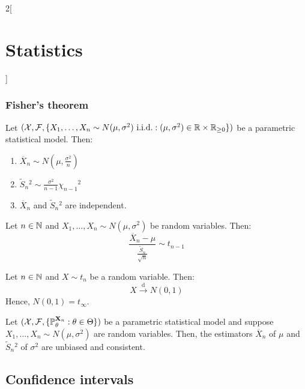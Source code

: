 \documentclass[../../../main_math.tex]{subfiles}
\begin{document}
\begin{multicols}{2}[\section{Statistics}]
  \subsubsection{Fisher's theorem}
  \begin{theorem}
    Let $(\mathcal{X},\mathcal{F},\{X_1,\ldots, \\X_n\sim N(\mu,\sigma^2)\text{ i.i.d.}:(\mu,\sigma^2)\in\mathbb{R}\times\mathbb{R}_{\geq 0}\})$ be a parametric statistical model. Then:
    \begin{enumerate}
      \item $\overline{X}_n\sim N\left(\mu,\frac{\sigma^2}{n}\right)$
      \item $\tilde{S}_n{}^2\sim\frac{\sigma^2}{n-1}{\chi_{n-1}}^2$
      \item $\overline{X}_n$ and $\tilde{S}_n{}^2$ are independent.
    \end{enumerate}
  \end{theorem}
  \begin{corollary}
    Let $n\in\mathbb{N}$ and $X_1,\ldots,X_n\sim N(\mu,\sigma^2)$ be \iid random variables. Then: $$\frac{\overline{X}_n-\mu}{\frac{\tilde{S}_n}{\sqrt{n}}}\sim t_{n-1}$$
  \end{corollary}
  \begin{corollary}
    Let $n\in\mathbb{N}$ and $X\sim t_n$ be a random variable. Then: $$X\overset{\text{d}}{\longrightarrow }N\left(0,1\right)$$
    Hence, $N(0,1)=t_\infty$.
  \end{corollary}
  \begin{corollary}
    Let $(\mathcal{X},\mathcal{F},\{\mathbb{P}_\theta^{\boldsymbol{\mathrm{X}}_n}:\theta\in\Theta\})$ be a parametric statistical model and suppose $X_1,\ldots,X_n\sim N(\mu,\sigma^2)$ are \iid random variables. Then, the estimators $\overline{X}_n$ of $\mu$ and $\tilde{S}_n{}^2$ of $\sigma^2$ are unbiased and consistent.
  \end{corollary}
  \begin{center}
    \begin{minipage}{\linewidth}
      \centering
      
    \end{minipage}
  \end{center}
  \subsection{Confidence intervals}

\end{multicols}
\end{document}
